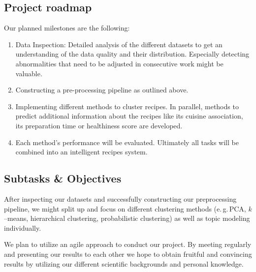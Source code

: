 \documentclass[
     12pt,         %
     a4paper,      %
     BCOR10mm,     %
     DIV14,        %
     ]{article}
\begin{document}
\subsection{Project roadmap}

Our planned milestones are the following:

\begin{enumerate}
  \item Data Inspection: Detailed analysis of the different datasets to get an understanding of the data quality and their distribution. Especially detecting abnormalities that need to be adjusted in consecutive work might be valuable.
  \item Constructing a pre-processing pipeline as outlined above.
  \item Implementing different methods to cluster recipes. In parallel, methods to predict additional information about the recipes like its cuisine association, its preparation time or healthiness score are developed.
  \item Each method's performance will be evaluated. Ultimately all tasks will be combined into an intelligent recipes system.
\end{enumerate}

\subsection{Subtasks \& Objectives}
After inspecting our datasets and successfully constructing our preprocessing pipeline, we might split up and focus on different clustering methods (e.\,g.\,PCA, $k$--means, hierarchical clustering, probabilistic clustering) as well as topic modeling individually.

We plan to utilize an agile approach to conduct our project. By meeting regularly and presenting our results to each other we hope to obtain fruitful and convincing results by utilizing our different scientific backgrounds and personal knowledge.



%
%
%


\newpage


\end{document}
